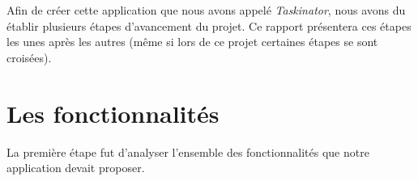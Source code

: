 \documentclass[a4paper,10pt]{article}
\begin{document}
Afin de créer cette application que nous avons appelé \textit{Taskinator}, nous avons du établir plusieurs étapes d'avancement du projet. Ce rapport présentera ces étapes les unes après les autres (même si lors de ce projet certaines étapes se sont croisées).

%

\newpage
\section{Les fonctionnalités}
La première étape fut d'analyser l'ensemble des fonctionnalités que notre application devait proposer. 
\end{document}
